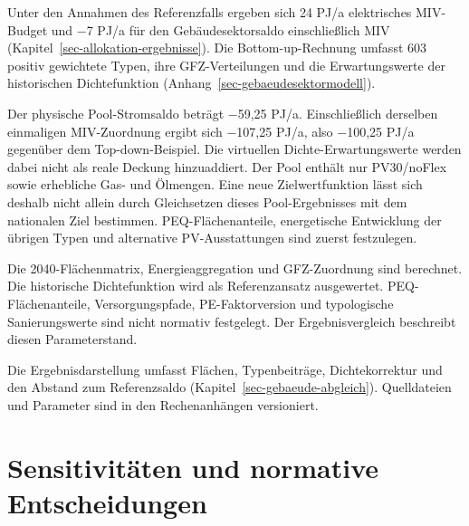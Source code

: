 \documentclass[
  ngerman,
  a4paper,
  DIV=11]{scrreprt}
\begin{document}
Unter den Annahmen des Referenzfalls ergeben sich 24 PJ/a elektrisches
MIV-Budget und −7 PJ/a für den Gebäudesektorsaldo einschließlich MIV
(Kapitel~\ref{sec-allokation-ergebnisse}). Die Bottom-up-Rechnung
umfasst 603 positiv gewichtete Typen, ihre GFZ-Verteilungen und die
Erwartungswerte der historischen Dichtefunktion
(Anhang~\ref{sec-gebaeudesektormodell}).

Der physische Pool-Stromsaldo beträgt −59,25 PJ/a. Einschließlich
derselben einmaligen MIV-Zuordnung ergibt sich −107,25 PJ/a, also
−100,25 PJ/a gegenüber dem Top-down-Beispiel. Die virtuellen
Dichte-Erwartungswerte werden dabei nicht als reale Deckung
hinzuaddiert. Der Pool enthält nur PV30/noFlex sowie erhebliche Gas- und
Ölmengen. Eine neue Zielwertfunktion lässt sich deshalb nicht allein
durch Gleichsetzen dieses Pool-Ergebnisses mit dem nationalen Ziel
bestimmen. PEQ-Flächenanteile, energetische Entwicklung der übrigen
Typen und alternative PV-Ausstattungen sind zuerst festzulegen.

\begin{tcolorbox}[enhanced jigsaw, arc=.35mm, bottomrule=.15mm, bottomtitle=1mm, breakable, colback=white, colbacktitle=quarto-callout-note-color!10!white, colframe=quarto-callout-note-color-frame, coltitle=black, left=2mm, leftrule=.75mm, opacityback=0, opacitybacktitle=0.6, rightrule=.15mm, title=\textcolor{quarto-callout-note-color}{\faInfo}\hspace{0.5em}{Geltungsbereich des Entwurfs}, titlerule=0mm, toprule=.15mm, toptitle=1mm]

Die 2040-Flächenmatrix, Energieaggregation und GFZ-Zuordnung sind
berechnet. Die historische Dichtefunktion wird als Referenzansatz
ausgewertet. PEQ-Flächenanteile, Versorgungspfade, PE-Faktorversion und
typologische Sanierungswerte sind nicht normativ festgelegt. Der
Ergebnisvergleich beschreibt diesen Parameterstand.

\end{tcolorbox}

Die Ergebnisdarstellung umfasst Flächen, Typenbeiträge, Dichtekorrektur
und den Abstand zum Referenzsaldo (Kapitel~\ref{sec-gebaeude-abgleich}).
Quelldateien und Parameter sind in den Rechenanhängen versioniert.

\section{Sensitivitäten und normative
Entscheidungen}\label{sensitivituxe4ten-und-normative-entscheidungen}
\end{document}
